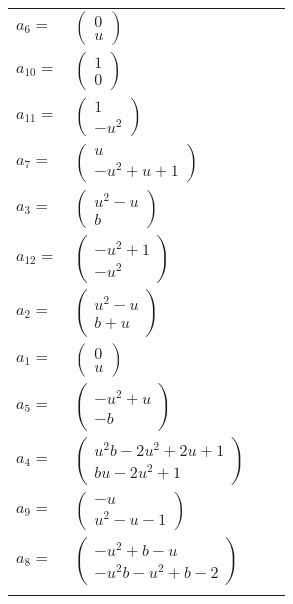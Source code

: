 \documentclass[1p]{elsarticle_modified}
\theoremstyle{definition}
\begin{document}
\begin{tabular}{m{7pt} m{180pt} m{7pt} m{180pt} }
\flushright $a_{6}=$&$\begin{pmatrix}0\\u\end{pmatrix}$ \\
\flushright $a_{10}=$&$\begin{pmatrix}1\\0\end{pmatrix}$ \\
\flushright $a_{11}=$&$\begin{pmatrix}1\\- u^2\end{pmatrix}$ \\
\flushright $a_{7}=$&$\begin{pmatrix}u\\- u^2+u+1\end{pmatrix}$ \\
\flushright $a_{3}=$&$\begin{pmatrix}u^2- u\\b\end{pmatrix}$ \\
\flushright $a_{12}=$&$\begin{pmatrix}- u^2+1\\- u^2\end{pmatrix}$ \\
\flushright $a_{2}=$&$\begin{pmatrix}u^2- u\\b+u\end{pmatrix}$ \\
\flushright $a_{1}=$&$\begin{pmatrix}0\\u\end{pmatrix}$ \\
\flushright $a_{5}=$&$\begin{pmatrix}- u^2+u\\- b\end{pmatrix}$ \\
\flushright $a_{4}=$&$\begin{pmatrix}u^2 b-2 u^2+2 u+1\\b u-2 u^2+1\end{pmatrix}$ \\
\flushright $a_{9}=$&$\begin{pmatrix}- u\\u^2- u-1\end{pmatrix}$ \\
\flushright $a_{8}=$&$\begin{pmatrix}- u^2+b- u\\- u^2 b- u^2+b-2\end{pmatrix}$\\&\end{tabular}
\end{document}
